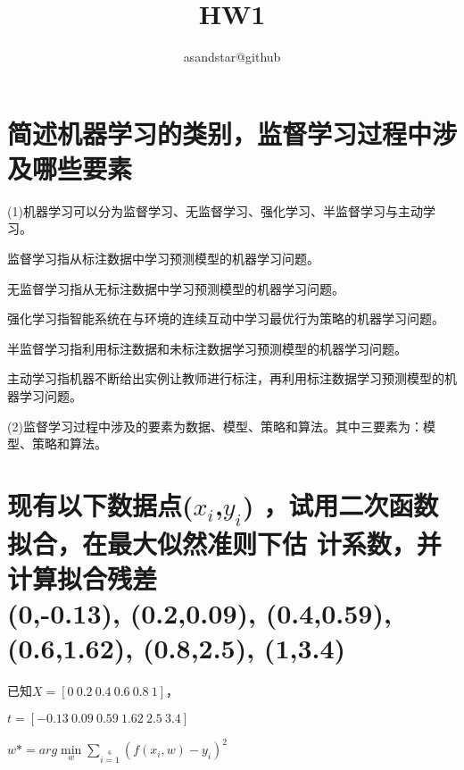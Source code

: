 \documentclass[UTF8]{ctexart}
\author{asandstar@github}
\title{HW1}
\begin{document}
\maketitle
\section{简述机器学习的类别，监督学习过程中涉及哪些要素}
 (1)机器学习可以分为监督学习、无监督学习、强化学习、半监督学习与主动学习。

监督学习指从标注数据中学习预测模型的机器学习问题。

无监督学习指从无标注数据中学习预测模型的机器学习问题。

强化学习指智能系统在与环境的连续互动中学习最优行为策略的机器学习问题。

半监督学习指利用标注数据和未标注数据学习预测模型的机器学习问题。

主动学习指机器不断给出实例让教师进行标注，再利用标注数据学习预测模型的机器学习问题。

(2)监督学习过程中涉及的要素为数据、模型、策略和算法。其中三要素为：模型、策略和算法。
\pagestyle{plain}
\section{现有以下数据点($x_{i}$,$y_{i}$)
  ，试用二次函数拟合，在最大似然准则下估
  计系数，并计算拟合残差\\
  (0,-0.13),
  (0.2,0.09),
  (0.4,0.59),
  (0.6,1.62),
  (0.8,2.5),
  (1,3.4)}

已知$X=[0\ 0.2\ 0.4\ 0.6\ 0.8\ 1]$，

$t=[-0.13\ 0.09\ 0.59\ 1.62\ 2.5\ 3.4]$


$w*=arg \mathop{min}\limits_{w}$$\sum\limits_{i=1}\limits^6$$ (f(x_{i},w)-y_{i})^2$


\end{document}
